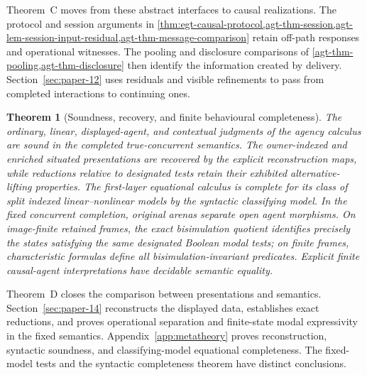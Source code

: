 \documentclass[11pt,a4paper]{article}
\numberwithin{equation}{section}
\theoremstyle{definition}
\theoremstyle{remark}
\theoremstyle{plain}
\newtheorem{maintheorem}{Theorem}
\begin{document}
Theorem~C moves from these abstract interfaces to causal realizations.
The protocol and session arguments in
\cref{thm:egt-causal-protocol,agt-thm-session,agt-lem-session-input-residual,agt-thm-message-comparison}
retain off-path responses and operational witnesses. The pooling and
disclosure comparisons of \cref{agt-thm-pooling,agt-thm-disclosure}
then identify the information created by delivery. Section~\ref{sec:paper-12}
uses residuals and visible refinements to pass from completed interactions
to continuing ones.

\begin{maintheorem}[Soundness, recovery, and finite behavioural completeness]
\label{main:D}
The ordinary, linear, displayed-agent, and contextual judgments of the
agency calculus are sound in the completed true-concurrent semantics.
The owner-indexed and enriched situated presentations are recovered by the
explicit reconstruction maps, while reductions relative to designated
tests retain their exhibited alternative-lifting properties.
The first-layer equational calculus is complete for its class of split
indexed linear--nonlinear models by the syntactic classifying model.
In the fixed concurrent completion, original arenas separate open agent
morphisms. On image-finite retained frames, the exact bisimulation
quotient identifies precisely the states satisfying the same designated
Boolean modal tests; on finite frames, characteristic formulas define
all bisimulation-invariant predicates. Explicit finite causal-agent
interpretations have decidable semantic equality. 
\end{maintheorem}

Theorem~D closes the comparison between presentations and semantics.
Section~\ref{sec:paper-14} reconstructs the displayed data, establishes
exact reductions, and proves operational separation and finite-state
modal expressivity in the fixed semantics. Appendix~\ref{app:metatheory}
proves reconstruction, syntactic soundness, and classifying-model
equational completeness. The fixed-model tests and the syntactic
completeness theorem have distinct conclusions.
\end{document}
